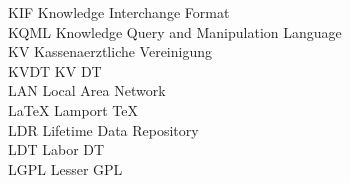 \begin{tabbing}


    \>KIF \>\>Knowledge Interchange Format\\



    \>KQML \>\>Knowledge Query and Manipulation Language\\

    \>KV \>\>Kassenaerztliche Vereinigung\\

    \>KVDT \>\>KV DT\\




    \>LAN \>\>Local Area Network\\






    \>LaTeX \>\>Lamport TeX\\


    \>LDR \>\>Lifetime Data Repository\\

    \>LDT \>\>Labor DT\\

    \>LGPL \>\>Lesser GPL\\


\end{tabbing}
